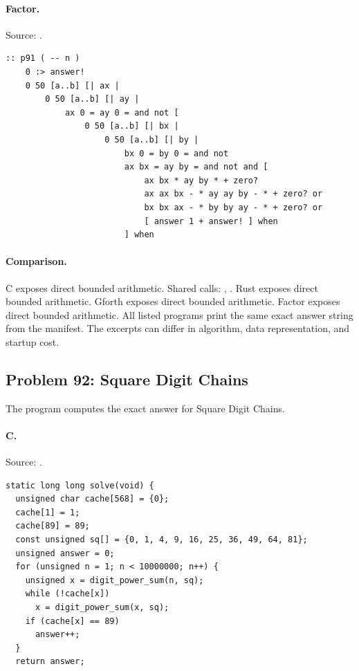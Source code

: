 \paragraph{Factor.} Source: .
\begin{lstlisting}
:: p91 ( -- n )
    0 :> answer!
    0 50 [a..b] [| ax |
        0 50 [a..b] [| ay |
            ax 0 = ay 0 = and not [
                0 50 [a..b] [| bx |
                    0 50 [a..b] [| by |
                        bx 0 = by 0 = and not
                        ax bx = ay by = and not and [
                            ax bx * ay by * + zero?
                            ax ax bx - * ay ay by - * + zero? or
                            bx bx ax - * by by ay - * + zero? or
                            [ answer 1 + answer! ] when
                        ] when
\end{lstlisting}

\paragraph{Comparison.}
C exposes direct bounded arithmetic. Shared calls: \texttt{}, \texttt{}. Rust exposes direct bounded arithmetic. Gforth exposes direct bounded arithmetic. Factor exposes direct bounded arithmetic.
All listed programs print the same exact answer string from the manifest. The excerpts can differ in algorithm, data representation, and startup cost.

\subsection{Problem 92: Square Digit Chains}
\label{walkthrough:p92}
The program computes the exact answer for Square Digit Chains.

\paragraph{C.} Source: .
\begin{lstlisting}
static long long solve(void) {
  unsigned char cache[568] = {0};
  cache[1] = 1;
  cache[89] = 89;
  const unsigned sq[] = {0, 1, 4, 9, 16, 25, 36, 49, 64, 81};
  unsigned answer = 0;
  for (unsigned n = 1; n < 10000000; n++) {
    unsigned x = digit_power_sum(n, sq);
    while (!cache[x])
      x = digit_power_sum(x, sq);
    if (cache[x] == 89)
      answer++;
  }
  return answer;
\end{lstlisting}

